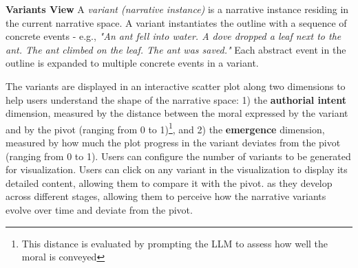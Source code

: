 \noindent\textbf{Variants View}\hspace{1mm} A {\em variant (narrative instance)} is a narrative instance residing in the current narrative space. A variant instantiates the outline with a sequence of concrete events - e.g., {\it "An ant fell into water. A dove dropped a leaf next to the ant. The ant climbed on the leaf. The ant was saved."} Each abstract event in the outline is expanded to multiple concrete events in a variant. 


The variants are displayed in an interactive scatter plot along two dimensions to help users understand the shape of the narrative space: 1) the \textbf{authorial intent} dimension, measured by the distance between the moral expressed by the variant and by the pivot (ranging from 0 to 1)\footnote{This distance is evaluated by prompting the LLM to assess how well the moral is conveyed}, and 2) the \textbf{emergence} dimension, measured by how much the plot progress in the variant deviates from the pivot (ranging from 0 to 1).  Users can configure the number of variants to be generated for visualization. Users can click on any variant in the visualization to display its detailed content, allowing them to compare it with the pivot.  as they develop across different stages, allowing them to perceive how the narrative variants evolve over time and deviate from the pivot.








